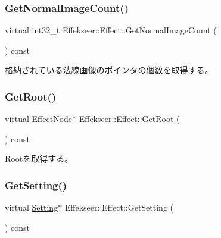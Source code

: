 \subsubsection{\texorpdfstring{Get\+Normal\+Image\+Count()}{GetNormalImageCount()}}
{\footnotesize\ttfamily virtual int32\+\_\+t Effekseer\+::\+Effect\+::\+Get\+Normal\+Image\+Count (\begin{DoxyParamCaption}{ }\end{DoxyParamCaption}) const\hspace{0.3cm}{\ttfamily [pure virtual]}}



格納されている法線画像のポインタの個数を取得する。 

\mbox{\label{class_effekseer_1_1_effect_ad1b5285e9df73c44cb132d07b116d994}} 
\subsubsection{\texorpdfstring{Get\+Root()}{GetRoot()}}
{\footnotesize\ttfamily virtual \mbox{\hyperlink{class_effekseer_1_1_effect_node}{Effect\+Node}}$\ast$ Effekseer\+::\+Effect\+::\+Get\+Root (\begin{DoxyParamCaption}{ }\end{DoxyParamCaption}) const\hspace{0.3cm}{\ttfamily [pure virtual]}}



Rootを取得する。 

\mbox{\label{class_effekseer_1_1_effect_ae6a1ef488670df8193befb9f054aded1}} 
\subsubsection{\texorpdfstring{Get\+Setting()}{GetSetting()}}
{\footnotesize\ttfamily virtual \mbox{\hyperlink{class_effekseer_1_1_setting}{Setting}}$\ast$ Effekseer\+::\+Effect\+::\+Get\+Setting (\begin{DoxyParamCaption}{ }\end{DoxyParamCaption}) const\hspace{0.3cm}{\ttfamily [pure virtual]}}



